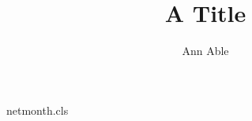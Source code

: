 \begin{filecontents*}[overwrite]{netmonth.cls}
\def\@anames{}\def\@xa{}
\renewcommand\author[1]{\gdef\@anames{#1}}
\newcommand\xa[1]{\gdef\@xa{\ignorespaces#1}}
\renewcommand\@author{\@anames\\\@xa}
\end{filecontents*}
\documentclass{netmonth}

\title{A Title}
\author{Ann Able}
\maketitle
Text.

